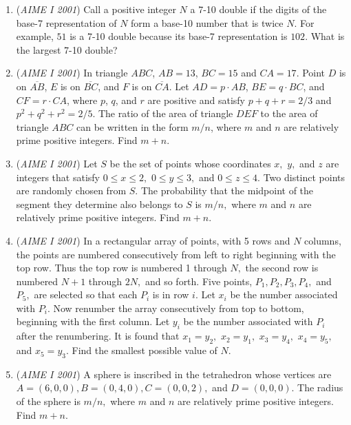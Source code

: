 \begin{enumerate}
 

	\item (\textit{AIME I 2001}) Call a positive integer $N$ a 7-10 double if the digits of the base-7 representation of $N$ form a base-10 number that is twice $N$. For example, $51$ is a 7-10 double because its base-7 representation is $102$. What is the largest 7-10 double?


 

	\item (\textit{AIME I 2001}) In triangle $ABC$, $AB=13$, $BC=15$ and $CA=17$. Point $D$ is on $\overline{AB}$, $E$ is on $\overline{BC}$, and $F$ is on $\overline{CA}$. Let $AD=p\cdot AB$, $BE=q\cdot BC$, and $CF=r\cdot CA$, where $p$, $q$, and $r$ are positive and satisfy $p+q+r=2/3$ and $p^2+q^2+r^2=2/5$. The ratio of the area of triangle $DEF$ to the area of triangle $ABC$ can be written in the form $m/n$, where $m$ and $n$ are relatively prime positive integers. Find $m+n$.


 

	\item (\textit{AIME I 2001}) Let $S$ be the set of points whose coordinates $x,$ $y,$ and $z$ are integers that satisfy $0\le x\le2,$ $0\le y\le3,$ and $0\le z\le4.$  Two distinct points are randomly chosen from $S.$  The probability that the midpoint of the segment they determine also belongs to $S$ is $m/n,$ where $m$ and $n$ are relatively prime positive integers.  Find $m + n.$


	\item (\textit{AIME I 2001}) In a rectangular array of points, with 5 rows and $N$ columns, the points are numbered consecutively from left to right beginning with the top row.  Thus the top row is numbered 1 through $N,$ the second row is numbered $N + 1$ through $2N,$ and so forth.  Five points, $P_1, P_2, P_3, P_4,$ and $P_5,$ are selected so that each $P_i$ is in row $i.$  Let $x_i$ be the number associated with $P_i.$  Now renumber the array consecutively from top to bottom, beginning with the first column.  Let $y_i$ be the number associated with $P_i$ after the renumbering.  It is found that $x_1 = y_2,$ $x_2 = y_1,$ $x_3 = y_4,$ $x_4 = y_5,$ and $x_5 = y_3.$  Find the smallest possible value of $N.$


	\item (\textit{AIME I 2001}) A sphere is inscribed in the tetrahedron whose vertices are $A = (6,0,0), B = (0,4,0), C = (0,0,2),$ and $D = (0,0,0).$  The radius of the sphere is $m/n,$ where $m$ and $n$ are relatively prime positive integers.  Find $m + n.$



\end{enumerate}
